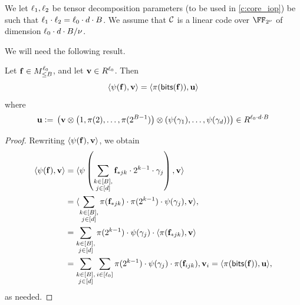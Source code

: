 \documentclass[11pt,letterpaper,usenames,dvipsnames]{article}
\begin{document}
We let $\ell_1,\ell_2$ be tensor decomposition parameters (to be used in \cref{c:core_iop}) be such that $\ell_1\cdot \ell_2= \ell_0\cdot d\cdot B$. We assume that $\mathcal{C}$ is a linear code over $\comfield$ of dimension $\ell_0\cdot d\cdot B/\nu$. %

We will need the following result.


\begin{lemma}\label{l:bitify}
    Let $\mathbf{f}\in M_{\leq B}^{\ell_0}$, and let $\mathbf{v}\in R^{\ell_0}$. Then %
    $$
    \langle \psi(\mathbf{f}), \mathbf{v} \rangle = \langle \pi(\mathsf{bits}(\mathbf{f})), \mathbf{u} \rangle
    $$
    where
    \begin{equation}\label{e:u_def}
    \mathbf{u} {\;\vcentcolon=\;}   \left(\mathbf{v} \otimes \left(1, \pi(2), \ldots, \pi(2^{B-1})\right) \otimes \left(\psi(\gamma_1), \ldots, \psi(\gamma_{d})\right)\right) \in R^{\ell_0\cdot d \cdot B}
    \end{equation}
\end{lemma}
\begin{proof}
Rewriting $\langle \psi(\mathbf{f}), \mathbf{v} \rangle$, we obtain 
%
\begin{align}
    \langle \psi(\mathbf{f}),\mathbf{v}\rangle &= \langle \psi\left(\sum_{\substack{k\in [B],\\ j\in [d]}} \mathbf{f}_{*jk} \cdot 2^{k-1} \cdot \gamma_j\right), \mathbf{v} \rangle\label{e:iop_linear_claim_1}\\ &= \langle \sum_{\substack{k\in [B],\\ j\in [d]}} \pi(\mathbf{f}_{*jk}) \cdot \pi(2^{k-1}) \cdot \psi(\gamma_j),\mathbf{v} \rangle,\label{e:iop_linear_claim_2}\\
    &= \sum_{\substack{k\in [B],\\ j\in [d]}} \pi(2^{k-1}) \cdot \psi(\gamma_j)\cdot \langle \pi(\mathbf{f}_{*jk}), \mathbf{v} \rangle \notag\\ &=   \sum_{\substack{k\in [B],\\ j\in [d]}} \sum_{i\in [\ell_0]} \pi(2^{k-1}) \cdot \psi(\gamma_j)\cdot  \pi(\mathbf{f}_{ijk}), \mathbf{v}_i = \langle \pi(\mathsf{bits}(\mathbf{f})), \mathbf{u} \rangle \notag,
\end{align}
as needed.
\end{proof}
\end{document}
